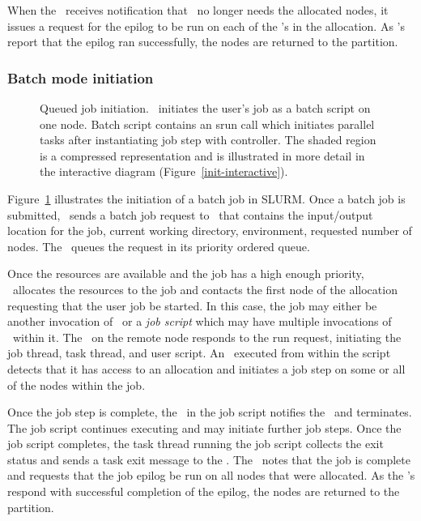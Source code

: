 When the \slurmctld\ receives notification that \srun\ no longer needs
the allocated nodes, it issues a request for the epilog to be run on each of
the \slurmd 's in the allocation. As \slurmd 's report that the epilog ran
successfully, the nodes are returned to the partition.


\subsubsection{Batch mode initiation}

\begin{figure}[tb]
\centerline{ }
\caption{\small Queued job initiation.
         \slurmctld\ initiates the user's job as a batch script on one node.
         Batch script contains an srun call which initiates parallel tasks
         after instantiating job step with controller. The shaded region is
         a compressed representation and is illustrated in more detail in the
         interactive diagram (Figure~\ref{init-interactive}).}
\label{init-batch}
\end{figure}

Figure~\ref{init-batch} illustrates the initiation of a batch  job in SLURM.
Once a batch job is submitted, \srun\ sends a batch job request
to \slurmctld\ that contains the input/output location for the job, current
working directory, environment, requested number of nodes. The
\slurmctld\ queues the request in its priority ordered queue.

Once the resources are available and the job has a high enough priority,
\slurmctld\ allocates the resources to the job and contacts the first node
of the allocation requesting that the user job be started. In this case,
the job may either be another invocation of \srun\ or a {\em job script} which
may have multiple invocations of \srun\ within it. The \slurmd\ on the remote
node responds to the run request, initiating the job thread, task thread,
and user script. An \srun\ executed from within the script detects that it
has access to an allocation and initiates a job step on some or all of the
nodes within the job.

Once the job step is complete, the \srun\ in the job script notifies the
\slurmctld\, and terminates. The job script continues executing and may
initiate further job steps. Once the job script completes, the task
thread running the job script collects the exit status and sends a task exit
message to the \slurmctld . The \slurmctld\ notes that the job is complete
and requests that the job epilog be run on all nodes that were allocated.
As the \slurmd 's respond with successful completion of the epilog,
the nodes are returned to the partition.

